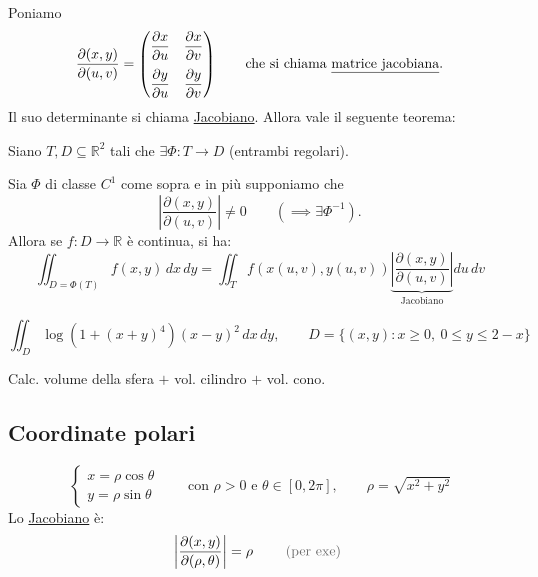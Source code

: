 Poniamo
\[
\frac{\partial(x, y)}{\partial(u, v)} = \begin{pmatrix}
\dfrac{\partial x}{\partial u} & \dfrac{\partial x}{\partial v} \\[10pt]
\dfrac{\partial y}{\partial u} & \dfrac{\partial y}{\partial v}
\end{pmatrix} \qquad \text{che si chiama \underline{matrice jacobiana}.}
\]
Il suo determinante si chiama \underline{Jacobiano}. Allora vale il seguente teorema:

\begin{theorem}[Teo (s.d.)]
Siano $T, D \subseteq \mathbb{R}^2$ tali che $\exists \Phi : T \to D$ (entrambi regolari).

Sia $\Phi$ di classe $C^1$ come sopra e in più supponiamo che
\[
\left| \frac{\partial(x, y)}{\partial(u, v)} \right| \neq 0 \qquad (\implies \exists \Phi^{-1}).
\]
Allora se $f : D \to \mathbb{R}$ è continua, si ha:
\[
\boxed{\iint_{D = \Phi(T)} f(x, y)\, dx\, dy = \iint_T f(x(u, v), y(u, v)) \underbrace{\left| \frac{\partial(x, y)}{\partial(u, v)} \right|}_{\text{Jacobiano}} du\, dv}
\]
\end{theorem}

\begin{esercizio}[EXE 1]
\[
\iint_D \log\left(1 + (x + y)^4\right)(x - y)^2\, dx\, dy, \qquad D = \{ (x, y) : x \ge 0, \ 0 \le y \le 2 - x \}
\]
\end{esercizio}

\begin{esercizio}[EXE 2]
Calc. volume della sfera $+$ vol. cilindro $+$ vol. cono.
\end{esercizio}

\subsection{Coordinate polari}

\[
\begin{cases}
x = \rho \cos \theta \\
y = \rho \sin \theta
\end{cases}
\qquad \text{con } \rho > 0 \text{ e } \theta \in [0, 2\pi], \qquad \rho = \sqrt{x^2 + y^2}
\]
Lo \underline{Jacobiano} è:
\[
\left| \frac{\partial(x, y)}{\partial(\rho, \theta)} \right| = \rho \qquad \text{\pencilnote{(per exe)}}
\]

